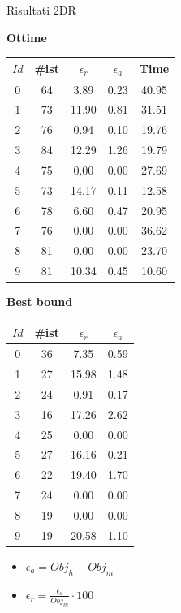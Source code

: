 \documentclass{beamer}
\begin{document}
\begin{frame}{Risultati 2DR}
	\begin{minipage}{0.49\textwidth}
		\centering
		\textbf{Ottime}
						
		\vspace{.5em}
		\begin{tabular}{c|c|c|c|c}
			$Id$ & \#ist & $\epsilon_r$ & $\epsilon_a$ & Time  \\
			\hline
			0    & 64    & 3.89         & 0.23         & 40.95 \\
			1    & 73    & 11.90        & 0.81         & 31.51 \\
			2    & 76    & 0.94         & 0.10         & 19.76 \\
			3    & 84    & 12.29        & 1.26         & 19.79 \\
			4    & 75    & 0.00         & 0.00         & 27.69 \\
			5    & 73    & 14.17        & 0.11         & 12.58 \\
			6    & 78    & 6.60         & 0.47         & 20.95 \\
			7    & 76    & 0.00         & 0.00         & 36.62 \\
			8    & 81    & 0.00         & 0.00         & 23.70 \\
			9    & 81    & 10.34        & 0.45         & 10.60 \\
		\end{tabular}
	\end{minipage}
	\begin{minipage}{0.49\textwidth}
		\centering
		\textbf{Best bound}
						
		\vspace{.5em}
		\begin{tabular}{c|c|c|c}
			$Id$ & \#ist & $\epsilon_r$ & $\epsilon_a$ \\
			\hline
			0    & 36    & 7.35         & 0.59         \\
			1    & 27    & 15.98        & 1.48         \\
			2    & 24    & 0.91         & 0.17         \\
			3    & 16    & 17.26        & 2.62         \\
			4    & 25    & 0.00         & 0.00         \\
			5    & 27    & 16.16        & 0.21         \\
			6    & 22    & 19.40        & 1.70         \\
			7    & 24    & 0.00         & 0.00         \\
			8    & 19    & 0.00         & 0.00         \\
			9    & 19    & 20.58        & 1.10         \\
		\end{tabular}
	\end{minipage}
	\vspace{.5em}
	\begin{itemize}
		\item $\epsilon_a = Obj_h - Obj_m$
		\item $\epsilon_r = \frac{\epsilon_a}{Obj_m} \cdot 100$
	\end{itemize}	
\end{frame}
\end{document}
